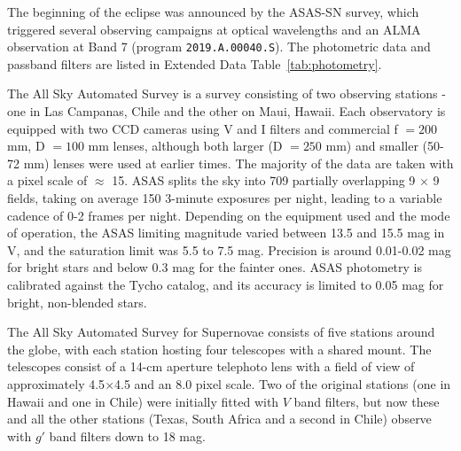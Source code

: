 \documentclass[sn-nature]{sn-jnl}%
\begin{document}
The beginning of the eclipse was announced \cite{RizzoSmith21} by the ASAS-SN survey, which triggered several observing campaigns at optical wavelengths and an ALMA observation at Band 7 (program \texttt{2019.A.00040.S}).
%
The photometric data and passband filters are listed in Extended Data Table~\ref{tab:photometry}.



%
%
The All Sky Automated Survey \cite[ASAS; ][]{pojmanski_all_1997, asas_2005, asas_2018} is a survey consisting of two observing stations - one in Las Campanas, Chile and the other on Maui, Hawaii. 
%
Each observatory is equipped with two CCD cameras using V and I filters and commercial f $ = 200$ mm, D $= 100$ mm lenses, although both larger (D $=250$ mm) and smaller (50-72 mm) lenses were used at earlier times.
%
The majority of the data are taken with a pixel scale of $\approx$ 15\arcsec{}.
%
ASAS splits the sky into 709 partially overlapping 9\degr{} $\times$ 9\degr{} fields, taking on average 150 3-minute exposures per night, leading to a variable cadence of 0-2 frames per night.
%
Depending on the equipment used and the mode of operation, the ASAS limiting magnitude varied between 13.5 and 15.5 mag in V, and the saturation limit was 5.5 to 7.5 mag. 
%
Precision is around 0.01-0.02 mag for bright stars and below 0.3 mag for the fainter ones. 
%
ASAS photometry is calibrated against the Tycho catalog, and its accuracy is limited to 0.05 mag for bright, non-blended stars.


The All Sky Automated Survey for Supernovae \cite[ASAS-SN; ][]{shappee_man_2014,kochanek_all-sky_2017} consists of five stations around the globe, with each station hosting four telescopes with a shared mount.
%
The telescopes consist of a 14-cm aperture telephoto lens with a field of view of approximately 4.5\degr{}$\times$4.5\degr{} and an 8.0\arcsec{} pixel scale.
% 
Two of the original stations (one in Hawaii and one in Chile) were initially fitted with $V$ band filters, but now these and all the other stations (Texas, South Africa and a second in Chile) observe with $g'$ band filters down to 18 mag.
\end{document}
